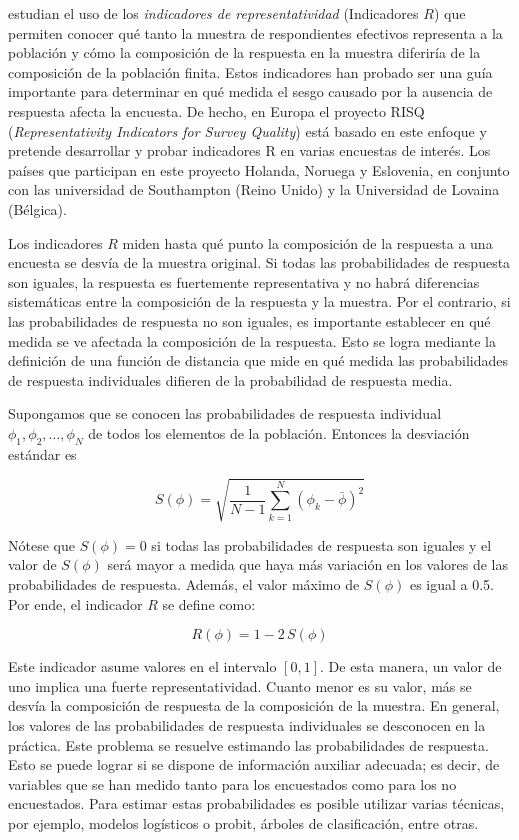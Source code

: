 \documentclass[
  12pt,
]{book}
\begin{document}
\citet{Shlomo_Skinner_Schouten_2012} estudian el uso de los \emph{indicadores de representatividad} (Indicadores \(R\)) que permiten conocer qué tanto la muestra de respondientes efectivos representa a la población y cómo la composición de la respuesta en la muestra diferiría de la composición de la población finita. Estos indicadores han probado ser una guía importante para determinar en qué medida el sesgo causado por la ausencia de respuesta afecta la encuesta. De hecho, en Europa el proyecto RISQ (\emph{Representativity Indicators for Survey Quality}) está basado en este enfoque y pretende desarrollar y probar indicadores R en varias encuestas de interés. Los países que participan en este proyecto Holanda, Noruega y Eslovenia, en conjunto con las universidad de Southampton (Reino Unido) y la Universidad de Lovaina (Bélgica).

Los indicadores \(R\) miden hasta qué punto la composición de
la respuesta a una encuesta se desvía de la muestra original. Si todas las probabilidades de respuesta son iguales, la respuesta
es fuertemente representativa y no habrá diferencias sistemáticas
entre la composición de la respuesta y la muestra. Por el contrario, si las probabilidades de respuesta no son iguales, es importante
establecer en qué medida se ve afectada la composición de la respuesta. Esto se logra mediante la definición de una función de distancia
que mide en qué medida las probabilidades de respuesta individuales
difieren de la probabilidad de respuesta media.

Supongamos que se conocen las probabilidades de respuesta individual
\(\phi_{1},\phi_{2},\ldots,\phi_{N}\) de todos los elementos de la población.
Entonces la desviación estándar es

\[
S\left(\phi\right)  =  \sqrt{\frac{1}{N-1}\sum_{k=1}^{N}\left(\phi_{k}-\bar{\phi}\right)^{2}}
\]

Nótese que \(S\left(\phi\right)=0\) si todas las probabilidades de respuesta
son iguales y el valor de \(S\left(\phi\right)\) será mayor a medida
que haya más variación en los valores de las probabilidades de respuesta. Además, el valor máximo de \(S\left(\phi\right)\) es igual a 0.5. Por ende, el indicador \(R\) se define como:

\[
R\left(\phi\right)=1-2\,S\left(\phi\right)
\]

Este indicador asume valores en el intervalo \(\left[0,1\right]\). De esta manera, un valor de uno implica una fuerte representatividad. Cuanto menor es su valor, más se desvía la composición de respuesta
de la composición de la muestra. En general, los valores de las probabilidades de respuesta individuales se desconocen en la práctica. Este problema se resuelve estimando las probabilidades de respuesta. Esto se puede lograr si se dispone de información auxiliar adecuada; es decir, de variables que se han medido tanto para los encuestados como para los no encuestados. Para estimar estas probabilidades es posible utilizar varias técnicas, por ejemplo, modelos logísticos o probit, árboles de clasificación, entre otras.
\end{document}
